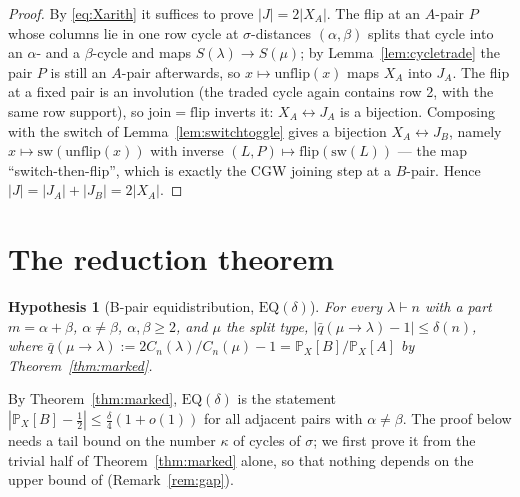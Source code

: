 \documentclass[11pt]{article}
\newtheorem{hypothesis}[theorem]{Hypothesis}
\theoremstyle{definition}
\renewcommand{\Pr}{\mathbb{P}}
\newcommand{\CC}{C}
\begin{document}
\begin{proof}
By \eqref{eq:Xarith} it suffices to prove $|J|=2|X_A|$.
The flip at an $A$-pair $P$ whose columns lie in one row cycle at
$\sigma$-distances $(\alpha,\beta)$ splits that cycle into an
$\alpha$- and a $\beta$-cycle and maps $S(\lambda)\to S(\mu)$; by
Lemma~\ref{lem:cycletrade} the pair $P$ is still an $A$-pair
afterwards, so $x\mapsto\mathrm{unflip}(x)$ maps $X_A$ into $J_A$.
The flip at a fixed pair is an involution (the traded cycle again
contains row 2, with the same row support), so
$\mathrm{join}=\mathrm{flip}$ inverts it: $X_A\leftrightarrow J_A$ is
a bijection.  Composing with the switch of
Lemma~\ref{lem:switchtoggle} gives a bijection
$X_A\leftrightarrow J_B$, namely
$x\mapsto \mathrm{sw}(\mathrm{unflip}(x))$ with inverse
$(L,P)\mapsto \mathrm{flip}(\mathrm{sw}(L))$ --- the map
``switch-then-flip'', which is exactly the CGW joining step at a
$B$-pair.  Hence $|J|=|J_A|+|J_B|=2|X_A|$.
\end{proof}


\section{The reduction theorem}\label{sec:reduction}

\begin{hypothesis}[B-pair equidistribution, $\mathrm{EQ}(\delta)$]\label{hyp:eq}
For every $\lambda\vdash n$ with a part $m=\alpha+\beta$, $\alpha\ne\beta$, $\alpha,\beta\ge2$, and $\mu$ the split type,
$\bigl|\bar q(\mu\to\lambda)-1\bigr|\le\delta(n)$, where $\bar q(\mu\to\lambda):=2\CC_n(\lambda)/\CC_n(\mu)-1=\Pr_X[B]/\Pr_X[A]$ by Theorem~\ref{thm:marked}.
\end{hypothesis}

By Theorem~\ref{thm:marked}, $\mathrm{EQ}(\delta)$ is the statement $|\Pr_X[B]-\tfrac12|\le\tfrac\delta4(1+o(1))$ for all adjacent pairs with $\alpha\ne\beta$.  The proof below needs a tail bound on the number $\kappa$ of cycles of $\sigma$; we first prove it from the trivial half of Theorem~\ref{thm:marked} alone, so that nothing depends on the upper bound of \cite[Lemma~3.12]{CGW08} (Remark~\ref{rem:gap}).
\end{document}
